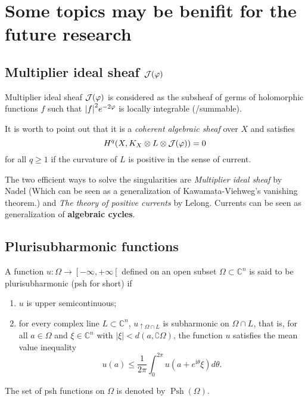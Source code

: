 \documentclass[lang=en,12pt,twoside]{textbook}
\begin{document}
\section{Some topics may be benifit for the future research}
\subsection{Multiplier ideal sheaf \texorpdfstring{${\mathcal J}(\varphi)$}{}}
\begin{definition}\label{defi:MIF}
    Multiplier ideal sheaf ${\mathcal J}(\varphi)$ is considered as the subsheaf of germs of holomorphic functions $f$  such that $\abs{f}^2 e^{-2\varphi}$ is locally integrable (/summable).

    It is worth to point out that it is a \emph{coherent algebraic sheaf} over $X$ and satisfies
    \[H^q(X,K_X\otimes L\otimes {\mathcal J}(\varphi))=0\]
    for all $q\geq 1$ if the curvature of $L$ is positive in the sense of current.
\end{definition}

The two efficient ways to solve the singularities are \emph{Multiplier ideal sheaf} by Nadel (Which can be seen as a generalization of Kawamata-Viehweg's vanishing theorem.) and \emph{The theory of positive currents} by Lelong. Currents can be seen as generalization of \textbf{algebraic cycles}.

\subsection{Plurisubharmonic functions}
\begin{definition}\label{def:psh functions}
    A function $u: \Omega \longrightarrow\left[-\infty,+\infty\left[\right.\right.$ defined on an open subset $\Omega \subset \mathbb{C}^n$ is said to be plurisubharmonic (psh for short) if
    \begin{enumerate}[label=(\alph*)]
        \item $u$ is upper semicontinuous;
        \item for every complex line $L \subset \mathbb{C}^n$, $u_{\uparrow \Omega \cap L}$ is subharmonic on $\Omega \cap L$, that is, for all $a \in \Omega$ and $\xi \in \mathbb{C}^n$ with $|\xi|<d(a, \complement \Omega)$, the function $u$ satisfies the mean value inequality
$$
u(a) \leqslant \frac{1}{2 \pi} \int_0^{2 \pi} u\left(a+e^{\mathrm{i} \theta} \xi\right) d \theta.
$$
    \end{enumerate}
The set of psh functions on $\Omega$ is denoted by $\operatorname{Psh}(\Omega)$.
\end{definition}
\end{document}
